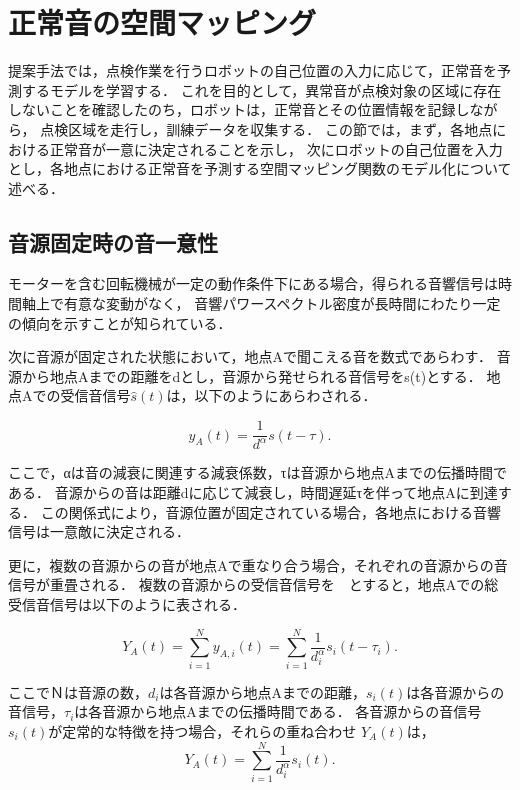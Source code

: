 \documentclass[../main]{subfiles}
\begin{document}
\section{正常音の空間マッピング}
\label{sec:pmethod_mapping}

提案手法では，点検作業を行うロボットの自己位置の入力に応じて，正常音を予測するモデルを学習する．
これを目的として，異常音が点検対象の区域に存在しないことを確認したのち，ロボットは，正常音とその位置情報を記録しながら，
点検区域を走行し，訓練データを収集する．
この節では，まず，各地点における正常音が一意に決定されることを示し，
次にロボットの自己位置を入力とし，各地点における正常音を予測する空間マッピング関数のモデル化について述べる．
\subsection{音源固定時の音一意性}

モーターを含む回転機械が一定の動作条件下にある場合，得られる音響信号は時間軸上で有意な変動がなく，
音響パワースペクトル密度が長時間にわたり一定の傾向を示すことが知られている\cite{beranek1992noise}．

次に音源が固定された状態において，地点Aで聞こえる音を数式であらわす．
音源から地点Aまでの距離をdとし，音源から発せられる音信号をs(t)とする．
地点Aでの受信音信号\(\hat{s}(t)\)は，以下のようにあらわされる．

\begin{equation} y_A(t) = \frac{1}{d^\alpha} s(t - \tau). \end{equation}

ここで，αは音の減衰に関連する減衰係数，τは音源から地点Aまでの伝播時間である．
音源からの音は距離dに応じて減衰し，時間遅延τを伴って地点Aに到達する．
この関係式により，音源位置が固定されている場合，各地点における音響信号は一意敵に決定される．

更に，複数の音源からの音が地点Aで重なり合う場合，それぞれの音源からの音信号が重畳される．
複数の音源からの受信音信号を　とすると，地点Aでの総受信音信号は以下のように表される．

\begin{equation} Y_A(t) = \sum_{i=1}^{N} y_{A,i}(t) = \sum_{i=1}^{N} \frac{1}{d_i^\alpha} s_i(t - \tau_i). \end{equation}

ここでＮは音源の数，\(d_i\)は各音源から地点Aまでの距離，\(s_i(t)\)は各音源からの音信号，\(\tau_i\)は各音源から地点Aまでの伝播時間である．
各音源からの音信号　\(s_i(t)\)が定常的な特徴を持つ場合，それらの重ね合わせ
\(Y_A(t)\)は，
\begin{equation} Y_A(t) = \sum_{i=1}^{N} \frac{1}{d_i^\alpha} s_i(t). \end{equation}
\end{document}
